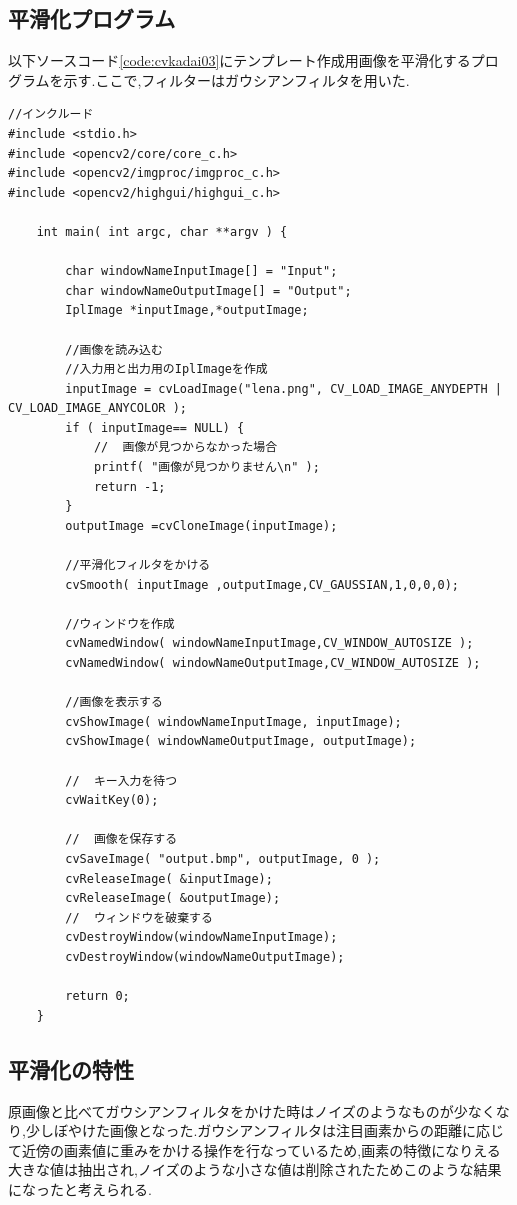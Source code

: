 \documentclass{jarticle}
\begin{document}
\subsection{平滑化プログラム}
以下ソースコード\ref{code:cvkadai03}にテンプレート作成用画像を平滑化するプログラムを示す.ここで,フィルターはガウシアンフィルタを用いた.
\begin{lstlisting}[caption = 動画に対するテンプレートマッチング,label=code:cvkadai02]
	//インクルード
#include <stdio.h>
#include <opencv2/core/core_c.h>
#include <opencv2/imgproc/imgproc_c.h>
#include <opencv2/highgui/highgui_c.h>

	int main( int argc, char **argv ) {

		char windowNameInputImage[] = "Input";
		char windowNameOutputImage[] = "Output";
		IplImage *inputImage,*outputImage;

		//画像を読み込む
		//入力用と出力用のIplImageを作成
		inputImage = cvLoadImage("lena.png", CV_LOAD_IMAGE_ANYDEPTH | CV_LOAD_IMAGE_ANYCOLOR );
		if ( inputImage== NULL) {
			//	画像が見つからなかった場合
			printf( "画像が見つかりません\n" );
			return -1;
		}
		outputImage =cvCloneImage(inputImage);

		//平滑化フィルタをかける 
		cvSmooth( inputImage ,outputImage,CV_GAUSSIAN,1,0,0,0);

		//ウィンドウを作成
		cvNamedWindow( windowNameInputImage,CV_WINDOW_AUTOSIZE );
		cvNamedWindow( windowNameOutputImage,CV_WINDOW_AUTOSIZE );

		//画像を表示する
		cvShowImage( windowNameInputImage, inputImage);
		cvShowImage( windowNameOutputImage, outputImage);

		//	キー入力を待つ
		cvWaitKey(0);

		//	画像を保存する
		cvSaveImage( "output.bmp", outputImage, 0 );
		cvReleaseImage( &inputImage);
		cvReleaseImage( &outputImage);
		//	ウィンドウを破棄する
		cvDestroyWindow(windowNameInputImage);
		cvDestroyWindow(windowNameOutputImage);

		return 0;
	}
\end{lstlisting}

\subsection{平滑化の特性}
原画像と比べてガウシアンフィルタをかけた時はノイズのようなものが少なくなり,少しぼやけた画像となった.ガウシアンフィルタは注目画素からの距離に応じて近傍の画素値に重みをかける操作を行なっているため,画素の特徴になりえる大きな値は抽出され,ノイズのような小さな値は削除されたためこのような結果になったと考えられる.
\end{document}
